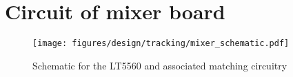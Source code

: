 \chapter{Circuit of mixer board} \label{appendix:mixerfig}
\begin{figure} [h]
\centering
\texttt{[image: figures/design/tracking/mixer\_schematic.pdf]}
\caption{Schematic for the LT5560 and associated matching circuitry}
\label{fig:app:mixerfigs}
\end{figure}